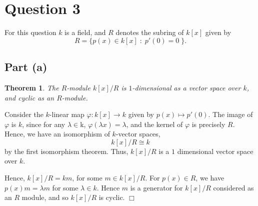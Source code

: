\documentclass[10pt]{article}
\newtheorem{theorem}{Theorem}
\newenvironment{proof}[1][Proof]{\begin{trivlist}
\item[\hskip \labelsep {\bfseries #1}]}{\end{trivlist}}
\newcommand{\isom}{\cong}
\begin{document}
\section*{Question 3}
    For this question $k$ is a field, and $R$ denotes
    the subring of $k[x]$ given by
    \begin{equation*}
        R = \{p(x)\in k[x]\;:\;p'(0) = 0\;\}.
    \end{equation*}
\subsection*{Part (a)}
    \begin{theorem}
        The $R$-module $k[x]/R$ is $1$-dimensional as a vector space
        over $k$, and cyclic as an $R$-module.
    \end{theorem}
    \begin{proof}
        Consider the $k$-linear map $\varphi:k[x]\rightarrow k$
        given by $p(x)\mapsto p'(0)$. The image of $\varphi$
        is $k$, since for any $\lambda \in $k, $\varphi(\lambda x) = \lambda$,
        and the kernel of $\varphi$ is precisely $R$. Hence, we have an isomorphism
        of $k$-vector spaces,
        \begin{equation*}
            k[x]/R \isom k
        \end{equation*}
        by the first isomorphism theorem. Thus, $k[x]/R$ is a $1$
        dimensional vector space over $k$.
        
        Hence, $k[x]/R = km$, for some $m \in k[x]/R$. For $p(x) \in R$,
        we have $p(x)m = \lambda m$ for some $\lambda \in k$. 
        Hence $m$ is a generator for $k[x]/R$ considered
        as an $R$ module, and so $k[x]/R$ is cyclic. $\Box$
    \end{proof}
    
\end{document}
